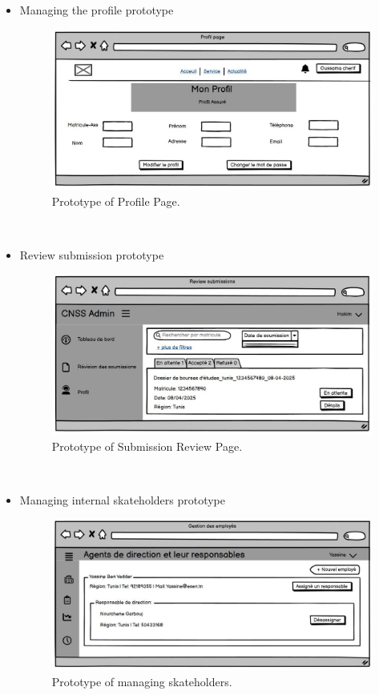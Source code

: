 \FloatBarrier
\begin{itemize}
    \item Managing the profile prototype
    \begin{figure}[h]
    \centering
    \includegraphics[width=1\textwidth]{figures/profil page.JPG} 
    \caption{Prototype of Profile Page.}
\end{figure}\
\end{itemize}
\clearpage
\begin{itemize}
    \item Review submission prototype 
    \begin{figure}[h]
    \centering
    \includegraphics[width=1\textwidth]{figures/review sub.JPG}
    \caption{Prototype of Submission Review Page.}
\end{figure}\
\end{itemize}
\begin{itemize}
    \item Managing internal skateholders prototype\begin{figure}[h!]
    \centering
    \includegraphics[width=1\textwidth]{figures/ges emp.JPG}
    \caption{Prototype of managing skateholders.}
\end{figure}\
\end{itemize}
